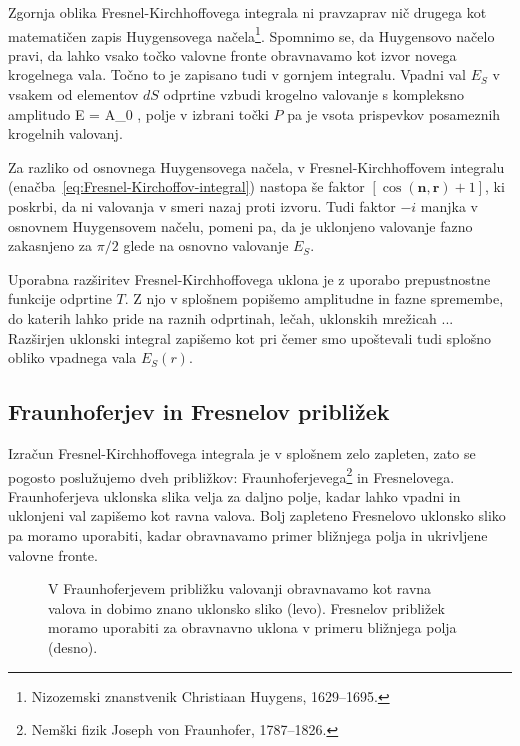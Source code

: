 Zgornja oblika Fresnel-Kirchhoffovega integrala ni pravzaprav nič drugega kot 
matematičen zapis Huygensovega 
načela\footnote{Nizozemski znanstvenik Christiaan Huygens, 1629--1695.}. 
Spomnimo se, da Huygensovo načelo pravi, da lahko vsako točko valovne fronte obravnavamo 
kot izvor novega krogelnega vala. Točno to je zapisano tudi v gornjem integralu. Vpadni val
$E_S$ v vsakem od elementov $dS$ odprtine vzbudi krogelno valovanje s
kompleksno amplitudo
\beq
E = A_0 ,
\eeq 
polje v izbrani točki $P$ pa je vsota prispevkov posameznih krogelnih valovanj.

Za razliko od osnovnega Huygensovega načela, v Fresnel-Kirchhoffovem integralu 
(enačba~\ref{eq:Fresnel-Kirchoffov-integral})
nastopa še faktor $\left[\cos(\mathbf{n},\mathbf{r})+1\right]$, ki poskrbi, da ni valovanja 
v smeri nazaj proti izvoru. Tudi faktor $-i$ manjka v osnovnem Huygensovem načelu,
pomeni pa, da je uklonjeno valovanje fazno zakasnjeno za $\pi/2$ glede na osnovno
valovanje $E_S$.

Uporabna razširitev Fresnel-Kirchhoffovega uklona je z uporabo prepustnostne funkcije odprtine $T$.
Z njo v splošnem popišemo amplitudne in fazne spremembe, do katerih lahko pride na raznih 
odprtinah, lečah, uklonskih mrežicah ... Razširjen uklonski integral zapišemo kot
pri čemer smo upoštevali tudi splošno obliko vpadnega vala $E_S(r)$.

\subsection*{Fraunhoferjev in Fresnelov približek}
\label{FFuklon}
Izračun Fresnel-Kirchhoffovega integrala je v splošnem zelo zapleten, zato se 
pogosto poslužujemo dveh približkov: Fraunhoferjevega\footnote{Nemški fizik 
Joseph von Fraunhofer, 1787--1826.} in Fresnelovega. 
Fraunhoferjeva uklonska slika velja za daljno polje, kadar lahko 
vpadni in uklonjeni val zapišemo kot ravna valova. Bolj zapleteno Fresnelovo uklonsko sliko pa moramo
uporabiti, kadar obravnavamo primer bližnjega polja in ukrivljene valovne fronte.
\begin{figure}[h]
\centering {} 
  
\caption{V Fraunhoferjevem približku valovanji obravnavamo kot ravna valova 
in dobimo znano uklonsko sliko (levo). Fresnelov približek moramo uporabiti za obravnavno uklona v 
primeru bližnjega polja (desno).}
\label{fig:UklonFF}
\end{figure}

